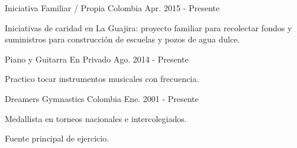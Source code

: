 \begin{cventries}
	{Iniciativa Familiar / Propia} %
	{Colombia} %
	{Apr. 2015 {-} Presente} %
	{
		\begin{cvitems} %
			\item {Iniciativas de caridad en La Guajira: proyecto familiar para recolectar fondos y suministros para construcción de escuelas y pozos de agua dulce.}
		\end{cvitems}
	}

	{Piano y Guitarra} %
	{En Privado} %
	{Ago. 2014 {-} Presente} %
	{
		\begin{cvitems} %
			\item {Practico tocar instrumentos musicales con frecuencia.}
		\end{cvitems}
	}

	{Dreamers Gymnastics} %
	{Colombia} %
	{Ene. 2001 {-} Presente} %
	{
		\begin{cvitems} %
			\item {Medallista en torneos nacionales e intercolegiados.}
			\item {Fuente principal de ejercicio.}
		\end{cvitems}
	}

\end{cventries}
